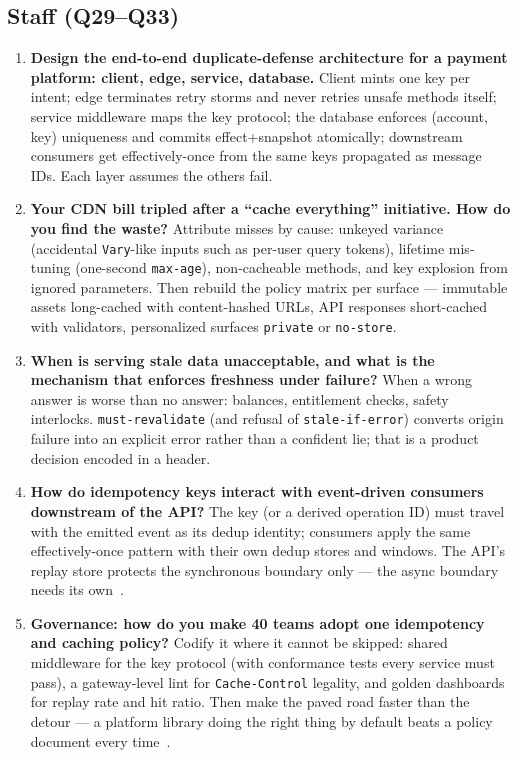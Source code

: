 \subsection*{Staff (Q29--Q33)}
\begin{enumerate}[label=\textbf{Q\arabic*.}, leftmargin=1.6cm, start=29]
  \item \textbf{Design the end-to-end duplicate-defense architecture for a
        payment platform: client, edge, service, database.}
        Client mints one key per intent; edge terminates retry storms and
        never retries unsafe methods itself; service middleware maps the
        key protocol; the database enforces (account, key) uniqueness and
        commits effect+snapshot atomically; downstream consumers get
        effectively-once from the same keys propagated as message IDs.
        Each layer assumes the others fail.
  \item \textbf{Your CDN bill tripled after a ``cache everything''
        initiative. How do you find the waste?}
        Attribute misses by cause: unkeyed variance (accidental
        \texttt{Vary}-like inputs such as per-user query tokens),
        lifetime mis-tuning (one-second \texttt{max-age}), non-cacheable
        methods, and key explosion from ignored parameters. Then rebuild
        the policy matrix per surface --- immutable assets long-cached with
        content-hashed URLs, API responses short-cached with validators,
        personalized surfaces \texttt{private} or \texttt{no-store}.
  \item \textbf{When is serving stale data unacceptable, and what is the
        mechanism that enforces freshness under failure?}
        When a wrong answer is worse than no answer: balances, entitlement
        checks, safety interlocks. \texttt{must-revalidate} (and refusal
        of \texttt{stale-if-error}) converts origin failure into an
        explicit error rather than a confident lie; that is a product
        decision encoded in a header.
  \item \textbf{How do idempotency keys interact with event-driven
        consumers downstream of the API?}
        The key (or a derived operation ID) must travel with the emitted
        event as its dedup identity; consumers apply the same
        effectively-once pattern with their own dedup stores and windows.
        The API's replay store protects the synchronous boundary only ---
        the async boundary needs its own~\cite{kleppmann2017ddia}.
  \item \textbf{Governance: how do you make 40 teams adopt one idempotency
        and caching policy?}
        Codify it where it cannot be skipped: shared middleware for the key
        protocol (with conformance tests every service must pass), a
        gateway-level lint for \texttt{Cache-Control} legality, and golden
        dashboards for replay rate and hit ratio. Then make the paved road
        faster than the detour --- a platform library doing the right thing
        by default beats a policy document every
        time~\cite{gehl2021apidesign,nygard2018releaseit}.
\end{enumerate}

